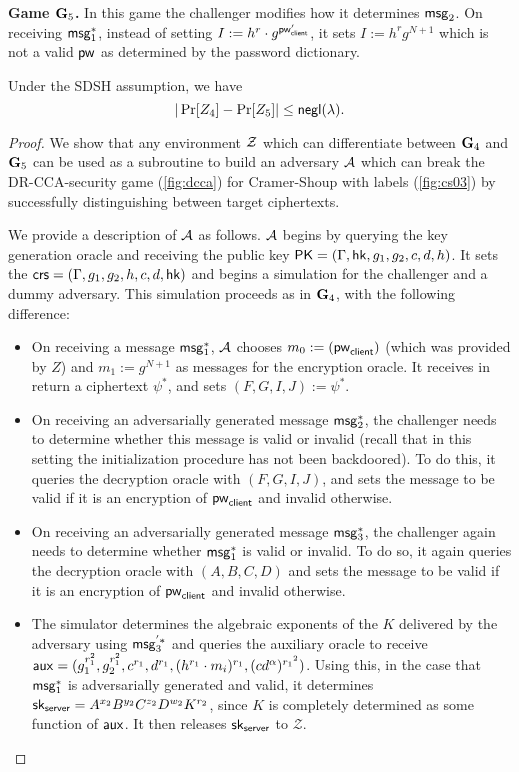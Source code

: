 \textbf{Game $\mathbf{G}_5$.} In this game the challenger modifies how it determines $\mathsf{msg}_{2}$. On receiving $\mathsf{msg}_{1}^{*}$, instead of setting $I:=h^r\cdot g^{\mathsf{pw}_{\mathsf{client}}'}$, it sets $I:=h^rg^{N+1}$ which is not a valid $\mathsf{pw}$ as determined by the password dictionary. 

\begin{lemma}
	Under the SDSH assumption, we have $$|\Pr[Z_4]-\Pr[Z_5]|\leq\mathsf{negl}(\lambda).$$
\end{lemma}
\begin{proof}
	We show that any environment $\mathcal{Z}$ which can differentiate between $\mathbf{G}_4$ and $\mathbf{G}_5$ can be used as a subroutine to build an adversary $\mathcal{A}$ which can break the DR-CCA-security game (\cref{fig:dcca}) for Cramer-Shoup with labels (\cref{fig:cs03}) by successfully distinguishing between target ciphertexts. 
	
	We provide a description of $\mathcal{A}$ as follows. $\mathcal{A}$ begins by querying the key generation oracle and receiving the public key $\mathsf{PK} = (\Gamma,\mathsf{hk},g_1,g_2,c,d,h)$. It sets the $\mathsf{crs} = (\Gamma,g_1,g_2,h,c,d,\mathsf{hk})$ and begins a simulation for the challenger and a dummy adversary. This simulation proceeds as in $\mathbf{G}_4$, with the following difference:
	
	\begin{itemize}
		\item On receiving a message $\mathsf{msg}_{1}^{*}$, $\mathcal{A}$ chooses $m_0:=(\mathsf{pw}_{\mathsf{client}})$ (which was provided by $Z$) and $m_1:=g^{N+1}$ as messages for the encryption oracle. It receives in return a ciphertext $\psi^{*}$, and sets $(F,G,I,J):=\psi^{*}$.
		\item On receiving an adversarially generated message $\mathsf{msg}_{2}^{*}$, the challenger needs to determine whether this message is valid or invalid (recall that in this setting the initialization procedure has not been backdoored). To do this, it queries the decryption oracle with $(F,G,I,J)$, and sets the message to be valid if it is an encryption of $\mathsf{pw}_{\mathsf{client}}$ and invalid otherwise.
		\item On receiving an adversarially generated message $\mathsf{msg}_{3}^{*}$, the challenger again needs to determine whether $\mathsf{msg}_{1}^{*}$ is valid or invalid. To do so, it again queries the decryption oracle with $(A,B,C,D)$ and sets the message to be valid if it is an encryption of $\mathsf{pw}_{\mathsf{client}}$ and invalid otherwise.
		\item The simulator determines the algebraic exponents of the $K$ delivered by the adversary using $\mathsf{msg}_{3}^{'*}$ and queries the auxiliary oracle to receive $\mathsf{aux} = (g_1^{r_1^2}, g_2^{r_1^2}, c^{r_1}, d^{r_1},(h^{r_1}\cdot m_i)^{r_1},(cd^{\alpha})^{{r_1}^2})$. Using this, in the case that $\mathsf{msg}_{1}^{*}$ is adversarially generated and valid, it determines $\mathsf{sk}_{\mathsf{server}} = A^{x_2}B^{y_2}C^{z_2}D^{w_2}K^{r_2}$, since $K$ is completely determined as some function of $\mathsf{aux}$. It then releases $\mathsf{sk}_{\mathsf{server}}$ to $\mathcal{Z}$.
	\end{itemize}


\end{proof}
